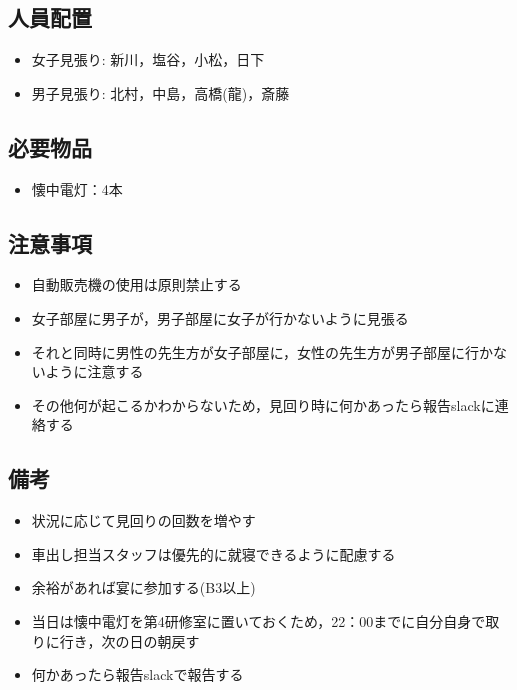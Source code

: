 




\subsection{人員配置}
\begin{itemize}
\item 女子見張り: 新川，塩谷，小松，日下
\item 男子見張り: 北村，中島，高橋(龍)，斎藤
\end{itemize}


\subsection{必要物品}
\begin{itemize}
\item 懐中電灯：4本
\end{itemize}


\subsection{注意事項}
\begin{itemize}
\item 自動販売機の使用は原則禁止する
\item 女子部屋に男子が，男子部屋に女子が行かないように見張る
\item それと同時に男性の先生方が女子部屋に，女性の先生方が男子部屋に行かないように注意する
\item その他何が起こるかわからないため，見回り時に何かあったら報告slackに連絡する
\end{itemize}

\subsection{備考}
\begin{itemize}
\item 状況に応じて見回りの回数を増やす
\item 車出し担当スタッフは優先的に就寝できるように配慮する
\item 余裕があれば宴に参加する(B3以上)
\item 当日は懐中電灯を第4研修室に置いておくため，22：00までに自分自身で取りに行き，次の日の朝戻す
\item 何かあったら報告slackで報告する
\end{itemize}

%
